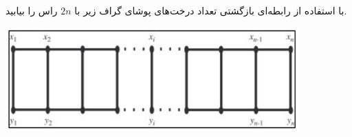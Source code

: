     \p 
با استفاده از رابطه‌ای بازگشتی تعداد درخت‌های پوشای گراف زیر با
$2n$
راس را بیابید.
\begin{center}
\includegraphics[height=4cm]{1.png}
\end{center}